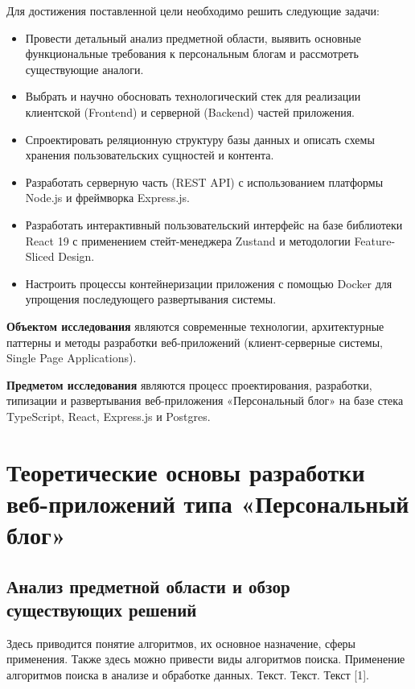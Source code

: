 \documentclass[a4paper,14pt]{extarticle}
\begin{document}
Для достижения поставленной цели необходимо решить следующие задачи:
\begin{itemize}
    \item Провести детальный анализ предметной области, выявить основные функциональные требования к персональным блогам и рассмотреть существующие аналоги.
    \item Выбрать и научно обосновать технологический стек для реализации клиентской (Frontend) и серверной (Backend) частей приложения.
    \item Спроектировать реляционную структуру базы данных и описать схемы хранения пользовательских сущностей и контента.
    \item Разработать серверную часть (REST API) с использованием платформы Node.js и фреймворка Express.js.
    \item Разработать интерактивный пользовательский интерфейс на базе библиотеки React 19 с применением стейт-менеджера Zustand и методологии Feature-Sliced Design.
    \item Настроить процессы контейнеризации приложения с помощью Docker для упрощения последующего развертывания системы.
\end{itemize}

\textbf{Объектом исследования} являются современные технологии, архитектурные паттерны и методы разработки веб-приложений (клиент-серверные системы, Single Page Applications).

\textbf{Предметом исследования} являются процесс проектирования, разработки, типизации и развертывания веб-приложения «Персональный блог» на базе стека TypeScript, React, Express.js и Postgres.

\newpage
\section{Теоретические основы разработки веб-приложений типа «Персональный блог»}

\subsection{Анализ предметной области и обзор существующих решений}
Здесь приводится понятие алгоритмов, их основное назначение, сферы применения. Также здесь можно привести виды алгоритмов поиска. Применение алгоритмов поиска в анализе и обработке данных. Текст. Текст. Текст [1].
\end{document}
